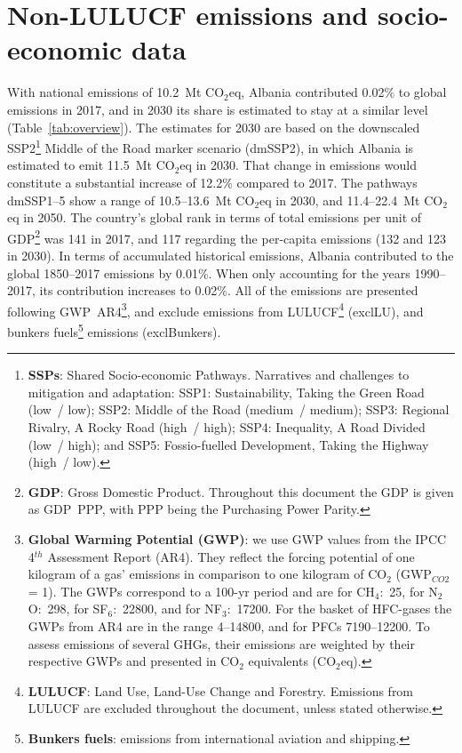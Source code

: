 \documentclass[12pt]{article}
\begin{document}
 \section{Non-LULUCF emissions and socio-economic data}
 \label{sec:nonLULUCFSocioEco}
 With national emissions of 10.2~Mt CO$_2$eq, Albania contributed 0.02\% to global emissions in 2017, and in 2030 its share is estimated to stay at a similar level (Table~\ref{tab:overview}).
 The estimates for 2030 are based on the downscaled SSP2\footnote{\textbf{SSPs}: Shared Socio-economic Pathways.
 Narratives and challenges to mitigation and adaptation: 
 SSP1: Sustainability, Taking the Green Road (low~/ low);
 SSP2: Middle of the Road (medium~/ medium);
 SSP3: Regional Rivalry, A Rocky Road (high~/ high);
 SSP4: Inequality, A Road Divided (low~/ high); and
 SSP5: Fossio-fuelled Development, Taking the Highway (high~/ low).} Middle of the Road marker scenario (dmSSP2), in which Albania is estimated to emit 11.5~Mt CO$_2$eq in 2030.
 That change in emissions would constitute a substantial increase of 12.2\% compared to 2017. 
 The pathways dmSSP1--5 show a range of 10.5--13.6~Mt CO$_2$eq in 2030, and 11.4--22.4~Mt CO$_2$eq in 2050.
 The country's global rank in terms of total emissions per unit of GDP\footnote{\textbf{GDP}: Gross Domestic Product. 
 Throughout this document the GDP is given as GDP~PPP, with PPP being the Purchasing Power Parity.} was 141 in 2017, and 117 regarding the per-capita emissions (132 and 123 in 2030).
 In terms of accumulated historical emissions, Albania contributed to the global 1850--2017 emissions by 0.01\%. 
 When only accounting for the years 1990--2017, its contribution increases to 0.02\%.
 All of the emissions are presented following GWP~AR4\footnote{\textbf{Global Warming Potential (GWP)}: we use GWP values from the IPCC 4$^{th}$ Assessment Report (AR4). 
 They reflect the forcing potential of one kilogram of a gas' emissions in comparison to one kilogram of CO$_2$ (GWP$_{CO2}$ = 1). 
 The GWPs correspond to a 100-yr period and are for CH$_4$:~25, for N$_2$O:~298, for SF$_6$:~22800, and for NF$_3$:~17200. 
 For the basket of HFC-gases the GWPs from AR4 are in the range 4--14800, and for PFCs 7190--12200. 
 To assess emissions of several GHGs, their emissions are weighted by their respective GWPs and presented in CO$_2$ equivalents (CO$_2$eq).}, and exclude emissions from LULUCF\footnote{\textbf{LULUCF}: Land Use, Land-Use Change and Forestry. 
 Emissions from LULUCF are excluded throughout the document, unless stated otherwise.} (exclLU), and bunkers fuels\footnote{\textbf{Bunkers fuels}: emissions from international aviation and shipping.} emissions (exclBunkers).
\end{document}
